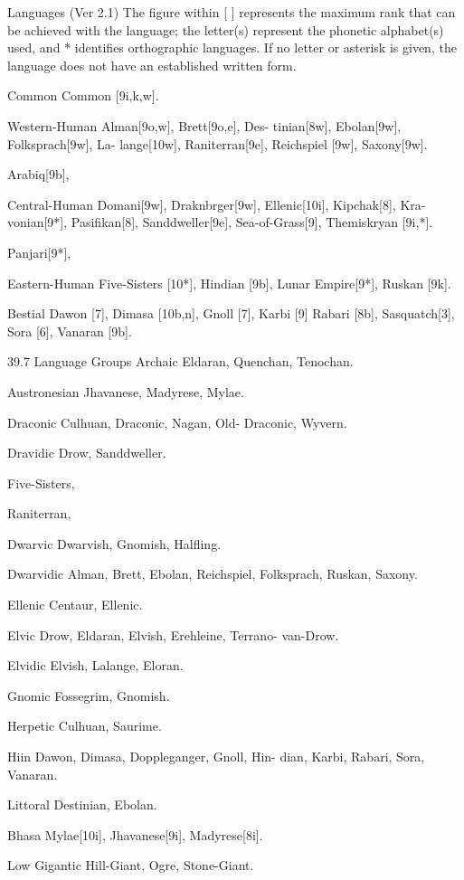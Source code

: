 \begin{Chapter}{Languages (Ver 2.1)}
The figure within [ ] represents the maximum rank that can be achieved
with the language; the letter(s) represent the phonetic alphabet(s)
used, and * identifies orthographic languages.  If no letter or
asterisk is given, the language does not have an established written
form.

Common Common [9i,k,w]. 

Western-Human  Alman[9o,w],  Brett[9o,e],  Des-
tinian[8w],  Ebolan[9w],  Folksprach[9w],  La-
lange[10w],  Raniterran[9e],  Reichspiel 
[9w], 
Saxony[9w]. 

Arabiq[9b], 

Central-Human 
Domani[9w], 
Draknbrger[9w],  Ellenic[10i],  Kipchak[8],  Kra-
vonian[9*], 
Pasifikan[8], 
Sanddweller[9e],  Sea-of-Grass[9],  Themiskryan 
[9i,*]. 

Panjari[9*], 

Eastern-Human  Five-Sisters  [10*],  Hindian  [9b], 
Lunar Empire[9*], Ruskan [9k]. 

Bestial  Dawon  [7],  Dimasa  [10b,n],  Gnoll  [7], 
Karbi  [9]  Rabari  [8b],  Sasquatch[3],  Sora  [6], 
Vanaran [9b]. 

39.7 Language Groups 
Archaic Eldaran, Quenchan, Tenochan. 

Austronesian Jhavanese, Madyrese, Mylae. 

Draconic  Culhuan,  Draconic,  Nagan,  Old-
Draconic, Wyvern. 

Dravidic  Drow, 
Sanddweller. 

Five-Sisters, 

Raniterran, 

Dwarvic Dwarvish, Gnomish, Halfling. 

Dwarvidic  Alman,  Brett,  Ebolan,  Reichspiel, 
Folksprach, Ruskan, Saxony. 

Ellenic Centaur, Ellenic. 

Elvic  Drow,  Eldaran,  Elvish,  Erehleine,  Terrano-
van-Drow. 

Elvidic Elvish, Lalange, Eloran.  

Gnomic Fossegrim, Gnomish.  

Herpetic Culhuan, Saurime. 

Hiin  Dawon,  Dimasa,  Doppleganger,  Gnoll,  Hin-
dian, Karbi, Rabari, Sora, Vanaran. 

Littoral Destinian, Ebolan. 

Bhasa Mylae[10i], Jhavanese[9i], Madyrese[8i]. 

Low Gigantic Hill-Giant, Ogre, Stone-Giant. 


\end{Chapter}
